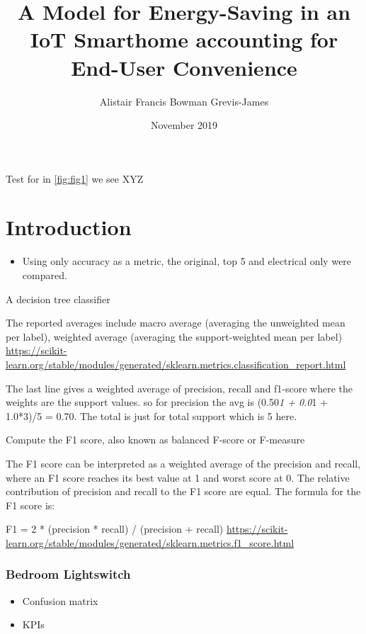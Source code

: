 \documentclass[11pt,]{article}
\title{A Model for Energy-Saving in an IoT Smarthome accounting for End-User
Convenience}
\author{Alistair Francis Bowman Grevis-James}
\date{November 2019}
\providecommand{\tightlist}{%
  \setlength{\itemsep}{0pt}\setlength{\parskip}{0pt}}
\begin{document}
\maketitle

{
\setcounter{tocdepth}{3}
\tableofcontents
}
\pagebreak

Test for in \ref{fig:fig1} we see XYZ

\hypertarget{introduction}{%
\section{Introduction}\label{introduction}}

\begin{itemize}
\tightlist
\item
  Using only accuracy as a metric, the original, top 5 and electrical
  only were compared.
\end{itemize}

A decision tree classifier

The reported averages include macro average (averaging the unweighted
mean per label), weighted average (averaging the support-weighted mean
per label)
\url{https://scikit-learn.org/stable/modules/generated/sklearn.metrics.classification_report.html}

The last line gives a weighted average of precision, recall and f1-score
where the weights are the support values. so for precision the avg is
(0.50\emph{1 + 0.0}1 + 1.0*3)/5 = 0.70. The total is just for total
support which is 5 here.

Compute the F1 score, also known as balanced F-score or F-measure

The F1 score can be interpreted as a weighted average of the precision
and recall, where an F1 score reaches its best value at 1 and worst
score at 0. The relative contribution of precision and recall to the F1
score are equal. The formula for the F1 score is:

F1 = 2 * (precision * recall) / (precision + recall)
\url{https://scikit-learn.org/stable/modules/generated/sklearn.metrics.f1_score.html}

\pagebreak

\hypertarget{bedroom-lightswitch}{%
\subsubsection{Bedroom Lightswitch}\label{bedroom-lightswitch}}

\begin{itemize}
\tightlist
\item
  Confusion matrix
\item
  KPIs
\end{itemize}
\end{document}
